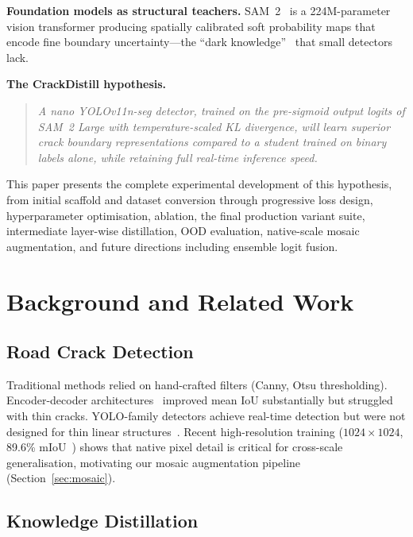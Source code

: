 \documentclass[12pt,a4paper]{article}
\begin{document}
\noindent\textbf{Foundation models as structural teachers.}
SAM~2~\cite{ravi2024sam2} is a 224M-parameter vision transformer producing
spatially calibrated soft probability maps that encode fine boundary
uncertainty---the ``dark knowledge''~\cite{hinton2015distilling} that small
detectors lack.

\noindent\textbf{The CrackDistill hypothesis.}
\begin{quote}
\emph{A nano YOLOv11n-seg detector, trained on the pre-sigmoid output logits
of SAM~2 Large with temperature-scaled KL divergence, will learn superior crack
boundary representations compared to a student trained on binary labels alone,
while retaining full real-time inference speed.}
\end{quote}

This paper presents the complete experimental development of this hypothesis,
from initial scaffold and dataset conversion through progressive loss design,
hyperparameter optimisation, ablation, the final production variant suite,
intermediate layer-wise distillation, OOD evaluation, native-scale mosaic
augmentation, and future directions including ensemble logit fusion.

\section{Background and Related Work}
\label{sec:related}

\subsection{Road Crack Detection}

Traditional methods relied on hand-crafted filters (Canny, Otsu thresholding).
Encoder-decoder architectures~\cite{ronneberger2015unet,chen2017deeplab}
improved mean IoU substantially but struggled with thin cracks.
YOLO-family detectors achieve real-time detection but were not designed for
thin linear structures~\cite{jocher2023ultralytics}.
Recent high-resolution training ($1024\times1024$, 89.6\% mIoU~\cite{crack_hires_2025})
shows that native pixel detail is critical for cross-scale generalisation,
motivating our mosaic augmentation pipeline (Section~\ref{sec:mosaic}).

\subsection{Knowledge Distillation}
\end{document}
